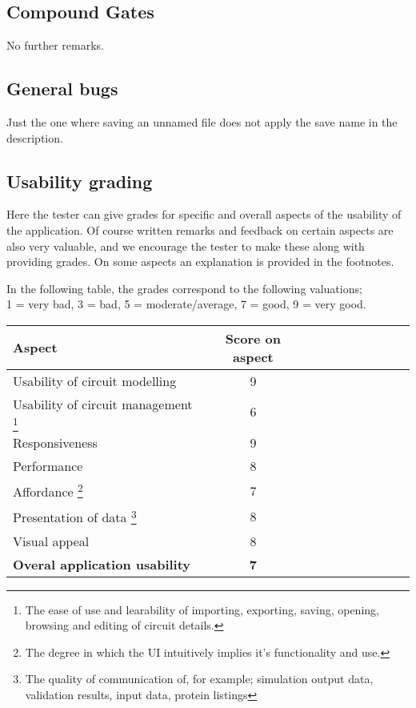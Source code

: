 \documentclass[a4paper]{article}
\begin{document}
\subsection{Compound Gates}
No further remarks.

\subsection{General bugs}
Just the one where saving an unnamed file does not apply the save name in the description.

\vfill
\subsection{Usability grading}
Here the tester can give grades for specific and overall aspects of the usability of the application. Of course written remarks and feedback on certain aspects are also very valuable, and we encourage the tester to make these along with providing grades. On some aspects an explanation is provided in the footnotes.

In the following table, the grades correspond to the following valuations;\\ 1 = very bad, 3 = bad, 5 = moderate/average, 7 = good, 9 = very good.
\begin{center}
\begin{tabularx}{\textwidth}{p{10cm} cc cc c cc cc} \toprule
\textbf{Aspect} & \multicolumn{1}{c}{\textbf{Score on aspect}} \\ \midrule
Usability of circuit modelling &9\\ \midrule
Usability of circuit management \footnote{The ease of use and learability of importing, exporting, saving, opening, browsing and editing of circuit details.} &6 \\ \midrule
Responsiveness &9 \\ \midrule
Performance &8 \\ \midrule
Affordance \footnote{The degree in which the UI intuitively implies it's functionality and use.} &7 \\ \midrule
Presentation of data \footnote{The quality of communication of, for example; simulation output data, validation results, input data, protein listings} &8 \\ \midrule
Visual appeal &8 \\ \midrule
\textbf{Overal application usability} &\textbf{7} \\ \bottomrule
\end{tabularx}
\end{center}
\end{document}
